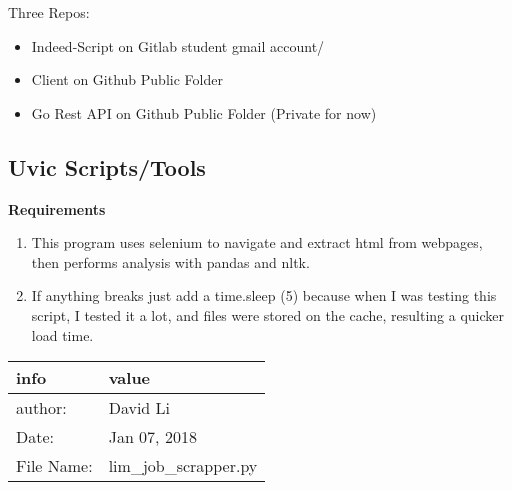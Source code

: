 Three Repos:

\begin{itemize}
\tightlist
\item
  Indeed-Script on Gitlab student gmail account/
\item
  Client on Github Public Folder
\item
  Go Rest API on Github Public Folder (Private for now)
\end{itemize}


\subsection{Uvic Scripts/Tools}\label{uvic-scriptstools}

\textbf{Requirements}

\begin{enumerate}
\def\labelenumi{\arabic{enumi}.}
\tightlist
\item
  This program uses selenium to navigate and extract html from webpages,
  then performs analysis with pandas and nltk.
\item
  If anything breaks just add a time.sleep (5) because when I was
  testing this script, I tested it a lot, and files were stored on the
  cache, resulting a quicker load time.
\end{enumerate}

\begin{longtable}[]{@{}ll@{}}
\toprule
\begin{minipage}[b]{0.20\columnwidth}\raggedright
info\strut
\end{minipage} & \begin{minipage}[b]{0.34\columnwidth}\raggedright
value\strut
\end{minipage}\tabularnewline
\midrule
\endhead
\begin{minipage}[t]{0.20\columnwidth}\raggedright
author:\strut
\end{minipage} & \begin{minipage}[t]{0.34\columnwidth}\raggedright
David Li\strut
\end{minipage}\tabularnewline
\begin{minipage}[t]{0.20\columnwidth}\raggedright
Date:\strut
\end{minipage} & \begin{minipage}[t]{0.34\columnwidth}\raggedright
Jan 07, 2018\strut
\end{minipage}\tabularnewline
\begin{minipage}[t]{0.20\columnwidth}\raggedright
File Name:\strut
\end{minipage} & \begin{minipage}[t]{0.34\columnwidth}\raggedright
lim\_job\_scrapper.py\strut
\end{minipage}\tabularnewline
\bottomrule
\end{longtable}

